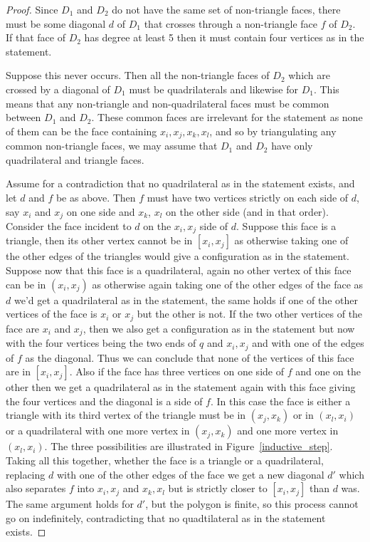 \documentclass[11pt]{article}
\theoremstyle{remark}
\theoremstyle{definition}
\begin{document}
\begin{proof}
  Since $D_1$ and $D_2$ do not have the same set of non-triangle faces, there must be some diagonal $d$ of $D_1$ that crosses through a non-triangle face $f$ of $D_2$.  If that face of $D_2$ has degree at least 5 then it must contain four vertices as in the statement.

Suppose this never occurs.  Then all the non-triangle faces of $D_2$ which are crossed by a diagonal of $D_1$ must be quadrilaterals and likewise for $D_1$.  This means that any non-triangle and non-quadrilateral faces must be common between $D_1$ and $D_2$.  These common faces are irrelevant for the statement as none of them can be the face containing $x_i, x_j, x_k, x_l$, and so by triangulating any common non-triangle faces, we may assume that $D_1$ and $D_2$ have only quadrilateral and triangle faces.

Assume for a contradiction that no quadrilateral as in the statement exists, and let $d$ and $f$ be as above.  Then $f$ must have two vertices strictly on each side of $d$, say $x_i$ and $x_j$ on one side and $x_k$, $x_l$ on the other side (and in that order).  Consider the face incident to $d$ on the $x_i, x_j$ side of $d$.  Suppose this face is a triangle, then its other vertex cannot be in $[x_i, x_j]$ as otherwise taking one of the other edges of the triangles would give a configuration as in the statement.  Suppose now that this face is a quadrilateral, again no other vertex of this face can be in $(x_i, x_j)$ as otherwise again taking one of the other edges of the face as $d$ we'd get a quadrilateral as in the statement, the same holds if one of the other vertices of the face is $x_i$ or $x_j$ but the other is not.  If the two other vertices of the face are $x_i$ and $x_j$, then we also get a configuration as in the statement but now with the four vertices being the two ends of $q$ and $x_i, x_j$ and with one of the edges of $f$ as the diagonal.  Thus we can conclude that none of the vertices of this face are in $[x_i, x_j]$.  Also if the face has three vertices on one side of $f$ and one on the other then we get a quadrilateral as in the statement again with this face giving the four vertices and the diagonal is a side of $f$.  In this case the face is either a triangle with its third vertex of the triangle must be in $(x_j,x_k)$ or in $(x_l,x_i)$ or a quadrilateral with one more vertex in $(x_j, x_k)$ and one more vertex in $(x_l, x_i)$.  The three possibilities are illustrated in Figure~\ref{inductive_step}. Taking all this together, whether the face is a triangle or a quadrilateral, replacing $d$ with one of the other edges of the face we get a new diagonal $d'$ which also separates $f$ into $x_i, x_j$ and $x_k, x_l$ but is strictly closer to $[x_i, x_j]$ than $d$ was.  The same argument holds for $d'$, but the polygon is finite, so this process cannot go on indefinitely, contradicting that no quadtilateral as in the statement exists.
\end{proof}
\end{document}
